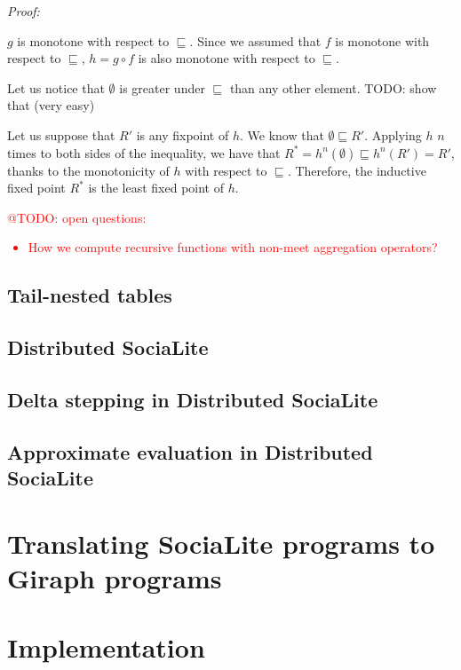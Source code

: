 \documentclass{pracamgr}
\makeatletter
\theoremstyle{plain}
\theoremstyle{definition}
\theoremstyle{remark}
\newcommand{\todo}[1]{\textcolor{red}{@TODO: #1}}
\makeatother
\begin{document}
\emph{Proof:} 

$g$ is monotone with respect to $\sqsubseteq$. Since we assumed that $f$ is monotone with respect to $\sqsubseteq$, $h = g \circ f$ is also monotone with respect to $\sqsubseteq$. 

Let us notice that $\emptyset$ is greater under $\sqsubseteq$ than any other element.
TODO: show that (very easy)

Let us suppose that $R'$ is any fixpoint of $h$.  We know that $\emptyset \sqsubseteq R'$. Applying $h$ $n$ times to both sides of the inequality, we have that $R^* = h^n(\emptyset) \sqsubseteq h^n(R') = R'$, thanks to the monotonicity of $h$ with respect to $\sqsubseteq$. Therefore, the inductive fixed point $R^*$ is the least fixed point of $h$.

\todo{open questions:
\begin{itemize}
\item How we compute recursive functions with non-meet aggregation operators?
\end{itemize}
}

\section{Tail-nested tables}\label{s:tnt}

\section{Distributed SociaLite}\label{s:distributed}

\section{Delta stepping in Distributed SociaLite}\label{s:deltastep}

\section{Approximate evaluation in Distributed SociaLite}\label{s:approxdist}

\chapter{Translating SociaLite programs to Giraph programs}\label{r:s2g}

\chapter{Implementation}\label{r:implementation}
\end{document}
